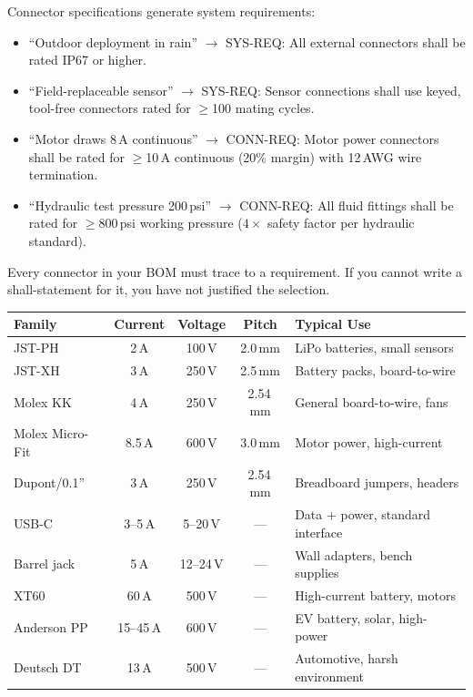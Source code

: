 \begin{keyconceptbox}
Connector specifications generate system requirements:
\begin{itemize}[nosep,leftmargin=1.5em]
\item ``Outdoor deployment in rain'' $\to$ SYS-REQ: All external connectors shall be rated IP67 or higher.
\item ``Field-replaceable sensor'' $\to$ SYS-REQ: Sensor connections shall use keyed, tool-free connectors rated for $\geq$100 mating cycles.
\item ``Motor draws 8\,A continuous'' $\to$ CONN-REQ: Motor power connectors shall be rated for $\geq$10\,A continuous (20\% margin) with 12\,AWG wire termination.
\item ``Hydraulic test pressure 200\,psi'' $\to$ CONN-REQ: All fluid fittings shall be rated for $\geq$800\,psi working pressure ($4\times$ safety factor per hydraulic standard).
\end{itemize}
Every connector in your BOM must trace to a requirement. If you cannot write a shall-statement for it, you have not justified the selection.
\end{keyconceptbox}

\begin{quickrefbox}
\begin{table}[H]\centering\small
\begin{tabularx}{\linewidth}{l c c c X}
\toprule
\textbf{Family} & \textbf{Current} & \textbf{Voltage} & \textbf{Pitch} & \textbf{Typical Use} \\
\midrule
JST-PH & 2\,A & 100\,V & 2.0\,mm & LiPo batteries, small sensors \\
JST-XH & 3\,A & 250\,V & 2.5\,mm & Battery packs, board-to-wire \\
Molex KK & 4\,A & 250\,V & 2.54\,mm & General board-to-wire, fans \\
Molex Micro-Fit & 8.5\,A & 600\,V & 3.0\,mm & Motor power, high-current \\
Dupont/0.1'' & 3\,A & 250\,V & 2.54\,mm & Breadboard jumpers, headers \\
USB-C & 3--5\,A & 5--20\,V & --- & Data + power, standard interface \\
Barrel jack & 5\,A & 12--24\,V & --- & Wall adapters, bench supplies \\
XT60 & 60\,A & 500\,V & --- & High-current battery, motors \\
Anderson PP & 15--45\,A & 600\,V & --- & EV battery, solar, high-power \\
Deutsch DT & 13\,A & 500\,V & --- & Automotive, harsh environment \\
\bottomrule
\end{tabularx}
\end{table}
\end{quickrefbox}


